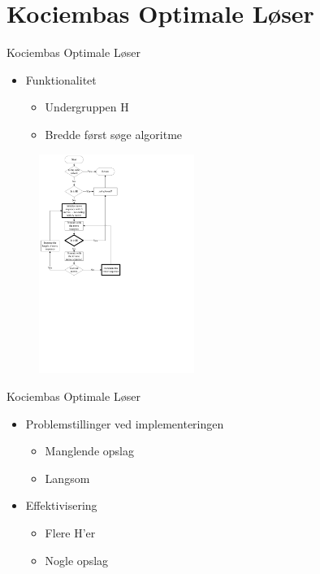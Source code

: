 \section{Kociembas Optimale L\o{}ser}
\begin{frame}{Kociembas Optimale L\o{}ser}
\parbox{0.5\textwidth}{
\begin{itemize}
	\item Funktionalitet
	\begin{itemize}
		\item Undergruppen H
		\item Bredde f\o{}rst s\o{}ge algoritme
	\end{itemize}
\end{itemize}}
\parbox{0.45\textwidth}{
\begin{figure}[htbp]
	\centering
			\includegraphics[width = 0.45\textwidth, trim = 0mm 130mm 100mm 0mm, clip]{../../Rapport/input/pics/kociambav2.pdf}
	\label{fig:kociembaFlow}
\end{figure}}
\end{frame}

\begin{frame}{Kociembas Optimale L\o{}ser}
\begin{itemize}
	\item Problemstillinger ved implementeringen
	\begin{itemize}
		\item Manglende opslag
		\item Langsom
	\end{itemize}
	\item Effektivisering
	\begin{itemize}
		\item Flere H'er
		\item Nogle opslag
	\end{itemize}
\end{itemize}
\end{frame}